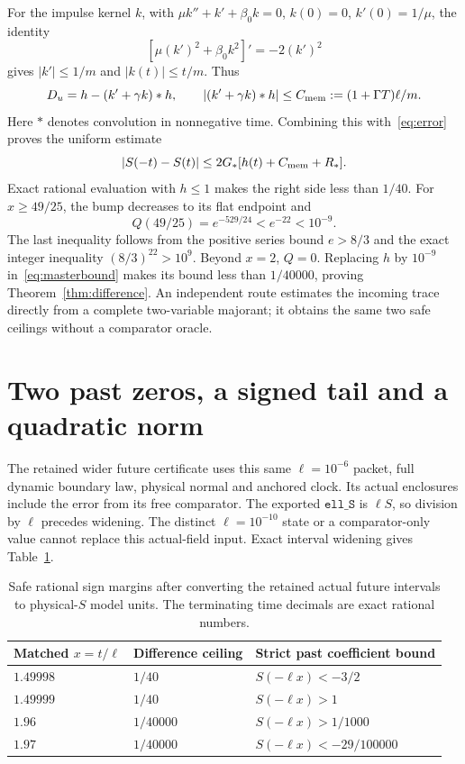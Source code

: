 \documentclass[11pt]{article}
\begin{document}
For the impulse kernel $k$, with
$\mu k''+k'+\beta_0k=0$, $k(0)=0$, $k'(0)=1/\mu$, the identity
\[
 [\mu(k')^2+\beta_0k^2]'=-2(k')^2
\]
gives $|k'|\le1/m$ and $|k(t)|\le t/m$. Thus
\[
 D_u=h-(k'+\gamma k)*h,\qquad
 |(k'+\gamma k)*h|\le C_{\rm mem}:=(1+\Gamma T)\ell/m.
\]
Here $*$ denotes convolution in nonnegative time.
Combining this with~\eqref{eq:error} proves the uniform estimate
\begin{equation}
 |S(-t)-S(t)|\le2G_*[h(t)+C_{\rm mem}+R_*].
 \label{eq:masterbound}
\end{equation}
Exact rational evaluation with $h\le1$ makes the right side less than $1/40$.
For $x\ge49/25$, the bump decreases to its flat endpoint and
\[
 Q(49/25)=e^{-529/24}<e^{-22}<10^{-9}.
\]
The last inequality follows from the positive series bound $e>8/3$ and
the exact integer inequality $(8/3)^{22}>10^9$. Beyond $x=2$, $Q=0$.
Replacing $h$ by $10^{-9}$ in~\eqref{eq:masterbound} makes its bound less
than $1/40000$, proving Theorem~\ref{thm:difference}. An independent route
estimates the incoming trace directly from a complete two-variable majorant;
it obtains the same two safe ceilings without a comparator oracle.

\section{Two past zeros, a signed tail and a quadratic norm}
The retained wider future certificate uses this same $\ell=10^{-6}$ packet,
full dynamic boundary law, physical normal and anchored clock. Its actual
enclosures include the error from its free comparator. The exported
$\mathtt{ell\_S}$ is $\ell S$, so division by $\ell$ precedes widening.
The distinct $\ell=10^{-10}$ state or a comparator-only value cannot replace
this actual-field input. Exact interval widening gives Table~\ref{tab:signs}.
\begin{table}[ht]
\centering
\begin{tabular}{lll}
\toprule
Matched $x=t/\ell$ & Difference ceiling & Strict past coefficient bound\\
\midrule
$1.49998$ & $1/40$ & $S(-\ell x)<-3/2$\\
$1.49999$ & $1/40$ & $S(-\ell x)>1$\\
$1.96$ & $1/40000$ & $S(-\ell x)>1/1000$\\
$1.97$ & $1/40000$ & $S(-\ell x)<-29/100000$\\
\bottomrule
\end{tabular}
\caption{Safe rational sign margins after converting the retained actual
future intervals to physical-$S$ model units. The terminating time decimals
are exact rational numbers.}\label{tab:signs}
\end{table}
\end{document}
